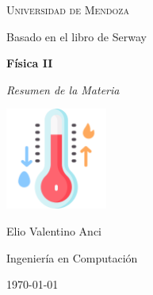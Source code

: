\documentclass[a4paper,12pt]{article}  %
\begin{document}
\begin{titlepage}
  \centering
  \vspace*{2cm} %

  {\scshape\LARGE Universidad de Mendoza\par}
  \vspace{2cm}
  {\large Basado en el libro de Serway\par}
  \vspace{1.5cm}

  {\Huge\bfseries Física II\par}
  \vspace{0.5cm}
  {\Large\itshape Resumen de la Materia\par} %

  \vspace{1.5cm}
  \includegraphics[width=0.25\textwidth]{images/cover.png} %
  \vspace{1.5cm}

  {\Large Elio Valentino Anci\par}
  {\large Ingeniería en Computación\par}

  \vfill

  {\large \today\par}
\end{titlepage}

\newpage

\tableofcontents  %

\newpage









\end{document}
